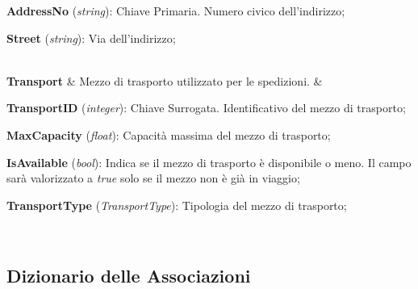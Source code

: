 {{  \textbf{AddressNo} (\textit{string}): Chiave Primaria. Numero civico dell'indirizzo; 

  \textbf{Street} (\textit{string}): Via dell'indirizzo;
  }\\

  \textbf{Transport} & Mezzo di trasporto utilizzato per le spedizioni. & 
  {\footnotesize
  \textbf{TransportID} (\textit{integer}): Chiave Surrogata. Identificativo del mezzo di trasporto;

  \textbf{MaxCapacity} (\textit{float}): Capacità massima del mezzo di trasporto;

  \textbf{IsAvailable} (\textit{bool}): Indica se il mezzo di trasporto è disponibile o meno. Il campo sarà valorizzato a \textit{true} solo se il mezzo non è già in viaggio;
  
  \textbf{TransportType} (\textit{TransportType}): Tipologia del mezzo di trasporto;
  }\\

}

\subsection{Dizionario delle Associazioni}

